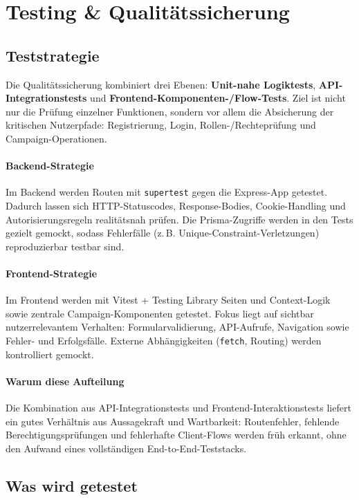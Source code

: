 \section{Testing \& Qualitätssicherung}

\subsection{Teststrategie}

Die Qualitätssicherung kombiniert drei Ebenen:
\textbf{Unit-nahe Logiktests}, \textbf{API-Integrationstests} und
\textbf{Frontend-Komponenten-/Flow-Tests}.
Ziel ist nicht nur die Prüfung einzelner Funktionen, sondern vor allem die
Absicherung der kritischen Nutzerpfade:
Registrierung, Login, Rollen-/Rechteprüfung und Campaign-Operationen.

\paragraph{Backend-Strategie}
Im Backend werden Routen mit \texttt{supertest} gegen die Express-App getestet.
Dadurch lassen sich HTTP-Statuscodes, Response-Bodies, Cookie-Handling und
Autorisierungsregeln realitätsnah prüfen.
Die Prisma-Zugriffe werden in den Tests gezielt gemockt, sodass
Fehlerfälle (z.\,B. Unique-Constraint-Verletzungen) reproduzierbar testbar sind.

\paragraph{Frontend-Strategie}
Im Frontend werden mit Vitest + Testing Library Seiten und
Context-Logik sowie zentrale Campaign-Komponenten getestet.
Fokus liegt auf sichtbar nutzerrelevantem Verhalten:
Formularvalidierung, API-Aufrufe, Navigation sowie Fehler- und Erfolgsfälle.
Externe Abhängigkeiten (\texttt{fetch}, Routing) werden kontrolliert gemockt.

\paragraph{Warum diese Aufteilung}
Die Kombination aus API-Integrationstests und Frontend-Interaktionstests liefert
ein gutes Verhältnis aus Aussagekraft und Wartbarkeit:
Routenfehler, fehlende Berechtigungsprüfungen und fehlerhafte Client-Flows werden
früh erkannt, ohne den Aufwand eines vollständigen End-to-End-Teststacks.

\subsection{Was wird getestet}

